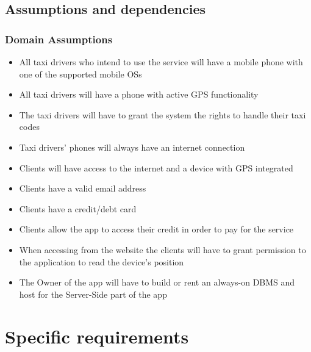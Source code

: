 \documentclass{article}
\begin{document}
\subsection{Assumptions and dependencies}
\subsubsection{Domain Assumptions}
\begin{itemize}
	\item All taxi drivers who intend to use the service will have a mobile phone with one of the supported mobile OSs
	\item All taxi drivers will have a phone with active GPS functionality
	\item The taxi drivers will have to grant the system the rights to handle their taxi codes %
	\item Taxi drivers' phones will always have an internet connection
	\item Clients will have access to the internet and a device with GPS integrated %
	\item Clients have a valid email address %
	\item Clients have a credit/debt card %
	\item Clients allow the app to access their credit in order to pay for the service
	\item When accessing from the website the clients will have to grant permission to the application to read the device's position %
	\item The Owner of the app will have to build or rent an always-on DBMS and host for the Server-Side part of the app %
\end{itemize}
\clearpage
\section{Specific requirements}
\end{document}
